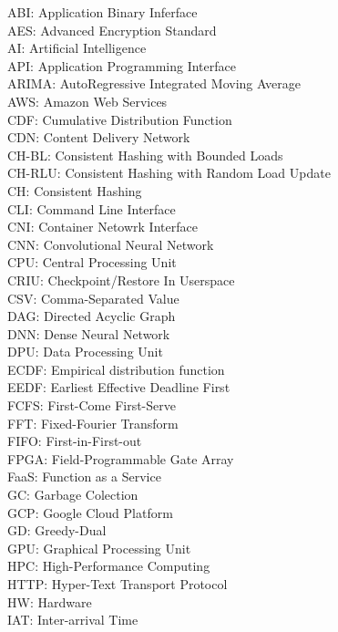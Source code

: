 \noindent
ABI: Application Binary Inferface \\
AES: Advanced Encryption Standard \\
AI: Artificial Intelligence \\
API: Application Programming Interface \\
ARIMA: AutoRegressive Integrated Moving Average \\
AWS: Amazon Web Services \\
CDF: Cumulative Distribution Function \\
CDN: Content Delivery Network \\
CH-BL: Consistent Hashing with Bounded Loads \\
CH-RLU: Consistent Hashing with Random Load Update \\
CH: Consistent Hashing \\
CLI: Command Line Interface \\
CNI: Container Netowrk Interface \\
CNN: Convolutional Neural Network \\
CPU: Central Processing Unit \\
CRIU: Checkpoint/Restore In Userspace \\
CSV: Comma-Separated Value \\
DAG: Directed Acyclic Graph \\
DNN: Dense Neural Network \\
DPU: Data Processing Unit \\
ECDF: Empirical distribution function \\
EEDF: Earliest Effective Deadline First \\
FCFS: First-Come First-Serve \\
FFT: Fixed-Fourier Transform \\
FIFO: First-in-First-out \\
FPGA: Field-Programmable Gate Array \\
FaaS: Function as a Service \\
GC: Garbage Colection \\
GCP: Google Cloud Platform \\
GD: Greedy-Dual \\
GPU: Graphical Processing Unit \\
HPC: High-Performance Computing \\
HTTP: Hyper-Text Transport Protocol \\
HW: Hardware \\
IAT: Inter-arrival Time \\
